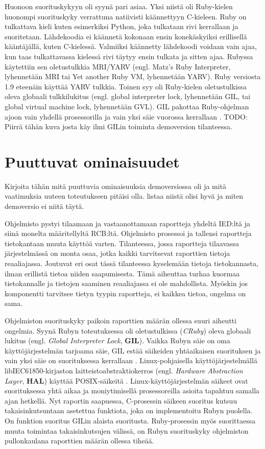 Huonoon suorituskykyyn oli syynä pari asiaa. Yksi niistä oli Ruby-kielen huonompi suorituskyky verrattuna natiivisti käännettyyn C-kieleen. Ruby on tulkattava kieli kuten esimerkiksi Python, joka tulkataan rivi kerrallaan ja suoritetaan. Lähdekoodia ei käännetä kokonaan ensin konekäskyiksi erillisellä kääntäjällä, kuten C-kielessä. Valmiiksi käännetty lähdekoodi voidaan vain ajaa, kun taas tulkattavassa kielessä rivi täytyy ensin tulkata ja sitten ajaa. Rubyssa käytettiin sen oletustulkkia MRI/YARV (engl. Matz's Ruby Interpreter, lyhennetään MRI tai Yet another Ruby VM, lyhennetään YARV). Ruby versiosta 1.9 eteenäin käyttää YARV tulkkia. Toinen syy oli Ruby-kielen oletustulkissa oleva globaali tulkkilukitus (engl. global interpreter lock, lyhennetään GIL, tai global virtual machine lock, lyhennetään GVL). GIL pakottaa Ruby-ohjelman ajoon vain yhdellä prosessorilla ja vain yksi säie vuorossa kerrallaan \cite[s.~131--133]{Odaira2014}. TODO: Piirrä tähän kuva josta käy ilmi GILin toiminta demoversion tilanteessa.


\section{Puuttuvat ominaisuudet}
\begin{it}
	Kirjoita tähän mitä puuttuvia ominaisuuksia demoversiossa oli ja mitä vaatimuksia uuteen toteutukseen pitäisi olla. listaa niistä olisi hyvä ja miten demoversio ei niitä täytä.
	
\end{it}
Ohjelmisto pystyi tilaamaan ja vastaanottamaan raportteja yhdeltä IED:ltä ja siinä monelta määritellyltä RCB:ltä. Ohjelmisto prosessoi ja tallensi raportteja tietokantaan muuta käyttöä varten. Tilanteessa, jossa raportteja tilaavassa järjestelmässä on monta osaa, jotka kaikki tarvitsevat raporttien tietoja reaaliajassa. Joutuvat eri osat tässä tilanteessa kyselemään tietoja tietokannasta, ilman erillistä tietoa niiden saapumisesta. Tämä aiheuttaa turhaa kuormaa tietokannalle ja tietojen saaminen reaaliajassa ei ole mahdollista. Myöskin jos komponentti tarvitsee tietyn tyypin raportteja, ei kaikkea tietoa, ongelma on sama.

Ohjelmiston suorituskyky paikoin raporttien määrän ollessa suuri aiheutti ongelmia. Syynä Rubyn toteutuksessa oli oletustulkissa (\emph{CRuby}) oleva globaali lukitus (engl. \emph{Global Interpreter Lock}, \textbf{GIL}). Vaikka Rubyn säie on oma käyttöjärjestelmän tarjoama säie, GIL estää säikeiden yhtäaikaisen suorituksen ja vain yksi säie on suorituksessa kerrallaan \mbox{\cite[s.~131--133]{Odaira2014}}. Linux-pohjaisella käyttöjärjestelmällä libIEC61850-kirjaston laitteistoabstraktiokerros (engl. \emph{Hardware Abstraction Layer}, \textbf{HAL}) käyttää POSIX-säikeitä \cite{libIEC61850-repo}. Linux-käyttöjärjestelmän säikeet ovat suorituksessa yhtä aikaa ja moniytimisellä prosessoreilla asioita tapahtuu samalla ajan hetkellä. Nyt raportin saapuessa, C-prosessin säikeen suoritus kutsuu takaisinkutsuntaan asetettua funktiota, joka on implementoitu Rubyn puolella. On funktion suoritus GILin alaista suoritusta. Ruby-prosessin myös suorittaessa muuta toimintaa takaisinkutsujen välissä, on Rubyn suorituskyky ohjelmiston pullonkaulana raporttien määrän ollessa tiheää.

